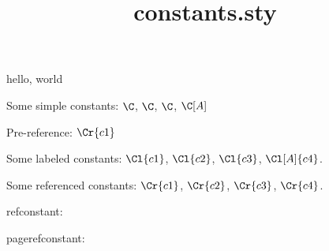 \documentclass{amsart}
\title{constants.sty}
\begin{document}
\maketitle

hello, world


Some simple constants: $\C$, $\C$, $\C$, $\C[A]$

Pre-reference: $\Cr{c1}$

Some labeled constants: $\Cl{c1}$, $\Cl{c2}$, $\Cl{c3}$, $\Cl[A]{c4}$.

Some referenced constants: $\Cr{c1}$, $\Cr{c2}$, $\Cr{c3}$, $\Cr{c4}$.

refconstant: 

pagerefconstant: 

\end{document}
